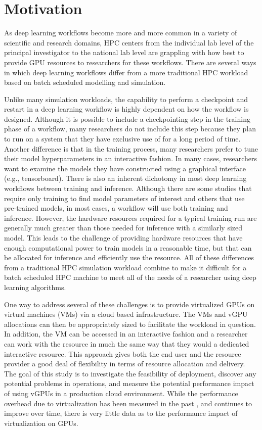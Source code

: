 \documentclass[acmtog, authorversion]{acmart}
\begin{document}
\section{Motivation}\label{sec:motive}
As deep learning workflows become more and more common in a variety of scientific and research domains, HPC centers from the individual lab level of the principal investigator to the national lab level are grappling with how best to provide GPU resources to researchers for these workflows. There are several ways in which deep learning workflows differ from a more traditional HPC workload based on batch scheduled modelling and simulation.

Unlike many simulation workloads, the capability to perform a checkpoint and restart in a deep learning workflow is highly dependent on how the  workflow is designed. Although it is possible to include a checkpointing step in the training phase of a workflow, many researchers do not include this step because they plan to run on a system that they have exclusive use of for a long period of time. Another difference is that in the training process, many researchers prefer to tune their model hyperparameters in an interactive fashion. In many cases, researchers want to examine the models they have constructed using a graphical interface (e.g., tensorboard). There is also an inherent dichotomy in most deep learning workflows between training and inference. Although there are some studies that require only training to find model parameters of interest and others that use pre-trained models, in most cases, a workflow will use both training and inference. However, the hardware resources required for a typical training run are generally much greater than those needed for inference with a similarly sized model. This leads to the challenge of providing hardware resources that have enough computational power to train models in a reasonable time, but that can be allocated for inference and efficiently use the resource. All of these differences from a traditional HPC simulation workload combine to make it difficult for a batch scheduled HPC machine to meet all of the needs of a researcher using deep learning algorithms.

One way to address several of these challenges is to provide virtualized GPUs on virtual machines (VMs) via a cloud based infrastructure. The VMs and vGPU allocations can then be appropriately sized to facilitate the workload in question. In addition, the VM can be accessed in an interactive fashion and a researcher can work with the resource in much the same way that they would a dedicated interactive resource. This approach gives both the end user and the resource provider a good deal of flexibility in terms of resource allocation and delivery. The goal of this study is to investigate the feasibility of deployment, discover any potential problems in operations, and measure the potential performance impact of using vGPUs in a production cloud environment. While the  performance overhead due to virtualization has been measured in the past \cite{iuhypervisor}, and continues to improve over time, there is very little data as to the performance impact of virtualization on GPUs. 
\end{document}

